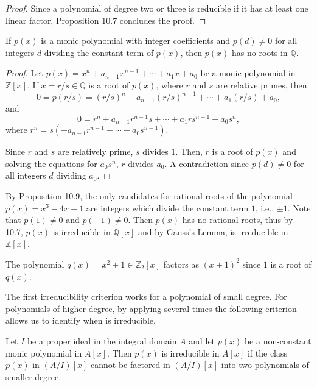 \documentclass[11pt,a4paper]{article}
\begin{document}
\begin{proof}
Since a polynomial of degree two or three is reducible if it has at least one linear factor, Proposition 10.7 concludes the proof.
\end{proof}

\begin{prop}[10.9]
If $p(x)$ is a monic polynomial with integer coefficients and $p(d) \neq 0$ for all integers $d$ dividing the constant term of $p(x)$, then $p(x)$ has no roots in $\mathbb{Q}$.
\end{prop}

\begin{proof}
Let $p(x) = x^n + a_{n-1}x^{n-1} + \cdots + a_1x + a_0$ be a monic polynomial in $\mathbb{Z}[x]$. If $x = r/s \in \mathbb{Q}$ is a root of $p(x)$, where $r$ and $s$ are relative primes, then
\[
0 = p(r/s) = (r/s)^n + a_{n-1}(r/s)^{n-1} + \cdots + a_1(r/s) + a_0,
\]
and
\[
0 = r^n + a_{n-1}r^{n-1}s + \cdots + a_1rs^{n-1} + a_0s^n,
\]
where $r^n = s(-a_{n-1}r^{n-1} - \cdots - a_0s^{n-1})$.

Since $r$ and $s$ are relatively prime, $s$ divides $1$. Then, $r$ is a root of $p(x)$ and solving the equations for $a_0s^n$, $r$ divides $a_0$. A contradiction since $p(d) \neq 0$ for all integers $d$ dividing $a_0$.
\end{proof}

\begin{exa}[10.10]
By Proposition 10.9, the only candidates for rational roots of the polynomial $p(x) = x^3 - 4x - 1$ are integers which divide the constant term $1$, i.e., $\pm 1$. Note that $p(1) \neq 0$ and $p(-1) \neq 0$. Then $p(x)$ has no rational roots, thus by 10.7, $p(x)$ is irreducible in $\mathbb{Q}[x]$ and by Gauss's Lemma, is irreducible in $\mathbb{Z}[x]$.
\end{exa}

\begin{exa}[10.11]
The polynomial $q(x) = x^2 + 1 \in \mathbb{Z}_2[x]$ factors as $(x + 1)^2$ since $1$ is a root of $q(x)$.
\end{exa}

The first irreducibility criterion works for a polynomial of small degree. For polynomials of
higher degree, by applying several times the following criterion allows us to identify when is
irreducible.

\begin{prop}
    Let $I$ be a proper ideal in the integral domain $A$ and let $p(x)$ be a non-constant monic polynomial in $A[x]$. Then $p(x)$ is irreducible in $A[x]$ if the class $p(x)$ in $(A/I)[x]$ cannot be factored in $(A/I)[x]$ into two polynomials of smaller degree.
    \end{prop}
    
\end{document}
